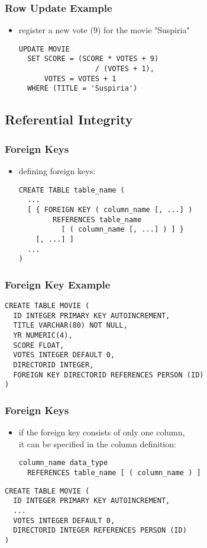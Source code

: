 \documentclass[dvipsnames]{beamer}
\theoremstyle{plain}
\begin{document}
\begin{frame}[fragile]
  \frametitle{Row Update Example}

  \begin{itemize}
    \item register a new vote (9) for the movie "Suspiria"
    \begin{lstlisting}
UPDATE MOVIE
  SET SCORE = (SCORE * VOTES + 9)
                  / (VOTES + 1),
      VOTES = VOTES + 1
  WHERE (TITLE = 'Suspiria')
    \end{lstlisting}
  \end{itemize}
\end{frame}

\subsection{Referential Integrity}

\begin{frame}[fragile]
  \frametitle{Foreign Keys}

  \begin{itemize}
    \item defining foreign keys:
    \begin{lstlisting}
CREATE TABLE table_name (
  ...
  [ { FOREIGN KEY ( column_name [, ...] )
        REFERENCES table_name
          [ ( column_name [, ...] ) ] }
    [, ...] ]
  ...
)
    \end{lstlisting}
  \end{itemize}
\end{frame}

\begin{frame}[fragile]
  \frametitle{Foreign Key Example}

  \begin{lstlisting}
CREATE TABLE MOVIE (
  ID INTEGER PRIMARY KEY AUTOINCREMENT,
  TITLE VARCHAR(80) NOT NULL,
  YR NUMERIC(4),
  SCORE FLOAT,
  VOTES INTEGER DEFAULT 0,
  DIRECTORID INTEGER,
  FOREIGN KEY DIRECTORID REFERENCES PERSON (ID)
)
  \end{lstlisting}
\end{frame}

\begin{frame}[fragile]
  \frametitle{Foreign Keys}

  \begin{itemize}
    \item if the foreign key consists of only one column,\\
      it can be specified in the column definition:
    \begin{lstlisting}
column_name data_type
  REFERENCES table_name [ ( column_name ) ]
    \end{lstlisting}
  \end{itemize}

  \begin{example}
    \begin{lstlisting}
CREATE TABLE MOVIE (
  ID INTEGER PRIMARY KEY AUTOINCREMENT,
  ...
  VOTES INTEGER DEFAULT 0,
  DIRECTORID INTEGER REFERENCES PERSON (ID)
)
    \end{lstlisting}
  \end{example}
\end{frame}
\end{document}
